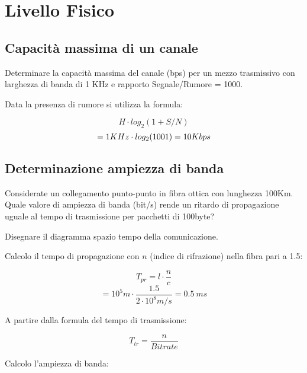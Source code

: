 \section{Livello Fisico}
    \subsection{Capacità massima di un canale}
        \problem
        Determinare la capacità massima del canale (bps) per un mezzo trasmissivo con larghezza di banda di 1 KHz e rapporto Segnale/Rumore = 1000.
        
        \solution
        Data la presenza di rumore si utilizza la formula:

        \begin{equation*}
            H \cdot log_2(1+S/N)
        \end{equation*}
        \begin{equation*}
            \centerline{$= 1KHz \cdot log_2(1001) = 10Kbps$}
        \end{equation*}

    \subsection{Determinazione ampiezza di banda}
        \problem
        Considerate un collegamento punto-punto in fibra ottica con lunghezza 100Km. Quale valore di ampiezza di banda (bit/s) rende un ritardo di propagazione uguale al tempo di trasmissione per pacchetti di 100byte?

        Disegnare il diagramma spazio tempo della comunicazione.

        \solution
        Calcolo il tempo di propagazione con $n$ (indice di rifrazione) nella fibra pari a 1.5:

        \begin{equation*}
            T_{pr} = l \cdot \frac{n}{c}
        \end{equation*}
        \begin{equation*}
            = 10^5m \cdot \frac{1.5}{2 \cdot 10^8  m/s} = 0.5 ~ ms
        \end{equation*}

        A partire dalla formula del tempo di trasmissione:

        \begin{equation*}
            T_{tr} = \frac{n}{Bitrate}
        \end{equation*}

        Calcolo l'ampiezza di banda:

